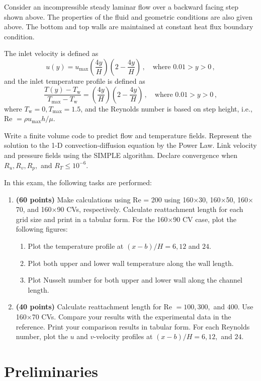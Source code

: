 \documentclass{article}
\begin{document}
Consider an incompressible steady laminar flow over a backward facing step shown above. The properties of the fluid and geometric conditions are also given above. The bottom and top walls are maintained at constant heat flux boundary condition.

The inlet velocity is defined as
\[
	u(y) = u_\mathrm{max} \left(\frac{4y}{H}\right) \left(2 - \frac{4y}{H}\right)\,, \quad \text{where } 0.01 > y > 0\,,
\]
and the inlet temperature profile is defined as
\[
	\frac{T(y) - T_\mathrm{w}}{T_\mathrm{max} - T_\mathrm{w}} = \left(\frac{4y}{H}\right) \left(2 - \frac{4y}{H}\right)\,, \quad \text{where } 0.01 > y > 0\,,
\]
where $T_\mathrm{w} = 0, T_\mathrm{max} = 1.5$, and the Reynolds number is based on step height, i.e., Re $=\rho u_\mathrm{max} h/\mu$.

Write a finite volume code to predict flow and temperature fields. Represent the solution to the 1-D convection-diffusion equation by the Power Law. Link velocity and pressure fields using the SIMPLE algorithm. Declare convergence when $R_u, R_v, R_p,$ and $R_T \leq 10^{-6}$.

In this exam, the following tasks are performed:
\begin{enumerate}
	\item \textbf{(60 points)} Make calculations using Re = 200 using 160$\times$30, 160$\times$50, 160$\times$70, and 160$\times$90 CVs, respectively. Calculate reattachment length for each grid size and print in a tabular form. For the 160$\times$90 CV case, plot the following figures:
	\begin{enumerate}[label=(\alph*)]
		\item Plot the temperature profile at $(x - b)/H = 6, 12$ and $24$.
		\item Plot both upper and lower wall temperature along the wall length.
		\item Plot Nusselt number for both upper and lower wall along the channel length.
	\end{enumerate}
	\item \textbf{(40 points)} Calculate reattachment length for Re $= 100, 300,$ and $400$. Use 160$\times$70 CVs. Compare your results with the experimental data in the reference. Print your comparison results in tabular form. For each Reynolds number, plot the $u$ and $v$-velocity profiles at $(x - b)/H = 6, 12,$ and $24$.
\end{enumerate}

\section{Preliminaries}
\end{document}
